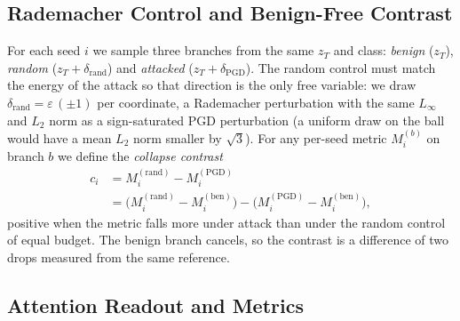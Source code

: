 \documentclass{article}
\begin{document}
\subsection{Rademacher Control and Benign-Free Contrast}

For each seed $i$ we sample three branches from the same $z_T$ and class: \textit{benign} ($z_T$), \textit{random} ($z_T + \delta_{\mathrm{rand}}$) and \textit{attacked} ($z_T + \delta_{\mathrm{PGD}}$). The random control must match the energy of the attack so that direction is the only free variable: we draw $\delta_{\mathrm{rand}} = \varepsilon\,(\pm 1)$ per coordinate, a Rademacher perturbation with the same $L_\infty$ and $L_2$ norm as a sign-saturated PGD perturbation (a uniform draw on the ball would have a mean $L_2$ norm smaller by $\sqrt{3}$). For any per-seed metric $M_i^{(b)}$ on branch $b$ we define the \textit{collapse contrast}
\begin{equation}\label{eq:contrast}
\begin{split}
  c_i &= M_i^{(\mathrm{rand})} - M_i^{(\mathrm{PGD})} \\
      &= \bigl(M_i^{(\mathrm{rand})} - M_i^{(\mathrm{ben})}\bigr) - \bigl(M_i^{(\mathrm{PGD})} - M_i^{(\mathrm{ben})}\bigr),
\end{split}
\end{equation}
positive when the metric falls more under attack than under the random control of equal budget. The benign branch cancels, so the contrast is a difference of two drops measured from the same reference.

\subsection{Attention Readout and Metrics}
\end{document}
